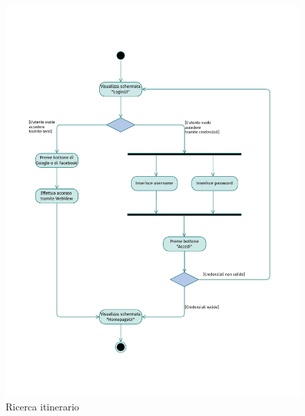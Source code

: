 \documentclass{natourDoc}
\begin{document}
	\newpage
	\begin{figure}[!htbp]
		\centering
		\includegraphics[width=\textwidth, page=2]{./diagrams/activity.pdf}
		\caption{Ricerca itinerario}
	\end{figure}
	\FloatBarrier
\end{document}
